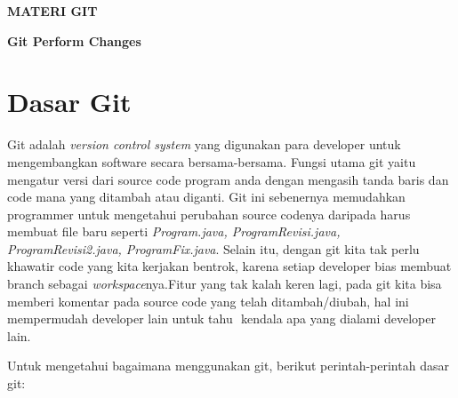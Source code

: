 
\sloppy
\begin{center}{\fontsize{16pt}{16pt}\selectfont \textbf{MATERI GIT} \\}\end{center} \par
\noindent 
\begin{center}{\fontsize{14pt}{14pt}\selectfont \textbf{Git Perform Changes} \\}\end{center} \par
\noindent 
\section{Dasar Git} 
\noindent 
 \hspace*{0.5in} Git adalah $  $\textit{version control system} $  $yang digunakan para developer untuk mengembangkan software secara bersama-bersama. Fungsi utama git yaitu mengatur versi dari source code program anda dengan mengasih tanda baris dan code mana yang ditambah atau diganti. Git ini sebenernya memudahkan programmer untuk mengetahui perubahan source codenya daripada harus membuat file baru seperti $  $\textit{Program.java, ProgramRevisi.java, }\textit{ProgramRevisi2.java, ProgramFix.java}. Selain itu, dengan git kita tak perlu khawatir code yang kita kerjakan bentrok, karena setiap developer bias membuat branch sebagai $  $\textit{workspace}nya.Fitur yang tak kalah keren lagi, pada git kita bisa memberi komentar pada source code yang telah ditambah/diubah, hal ini mempermudah developer lain untuk tahu $  $ kendala apa yang dialami developer lain. \par
\noindent 
Untuk mengetahui bagaimana menggunakan git, berikut perintah-perintah dasar git: \par
\noindent 
